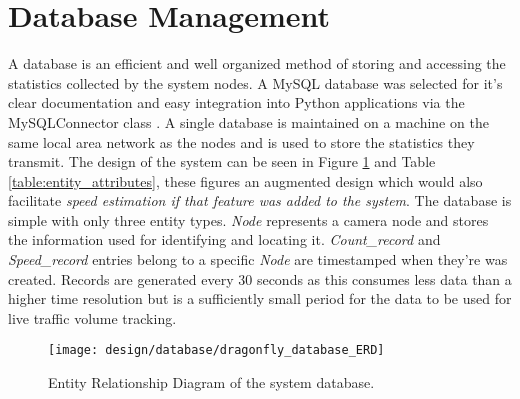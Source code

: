 \section{Database Management}

A database is an efficient and well organized method of storing and accessing the statistics collected by the system nodes. A MySQL database was selected for it's clear documentation and easy integration into Python applications via the MySQLConnector class \cite{mysqlconnector}. A single database is maintained on a machine on the same local area network as the nodes and is used to store the statistics they transmit. The design of the system can be seen in Figure \ref{fig:erd} and Table \ref{table:entity_attributes}, these figures an augmented design which would also facilitate \emph{speed estimation if that feature was added to the system}. The database is simple with only three entity types. \emph{Node} represents a camera node and stores the information used for identifying and locating it. \emph{Count\_record} and \emph{Speed\_record} entries belong to a specific \emph{Node} are timestamped when they're was created. Records are generated every 30 seconds as this consumes less data than a higher time resolution but is a sufficiently small period for the data to be used for live traffic volume tracking. 

\begin{figure}[H]
    \centering
    \centering\texttt{[image: design/database/dragonfly\_database\_ERD]}
    \caption{Entity Relationship Diagram of the system database.}
    \label{fig:erd}
  \end{figure}

